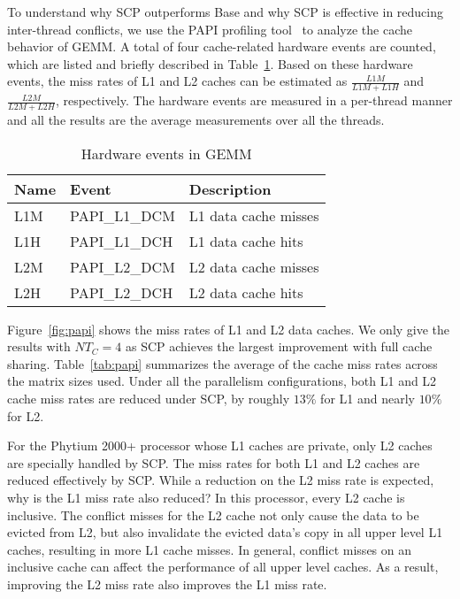 To understand why SCP outperforms Base and
why SCP is effective in reducing
inter-thread conflicts, 
we use the PAPI profiling tool~\cite{papi} to
analyze the cache behavior of GEMM. A total of 
four cache-related hardware events are counted,
which are listed and briefly described in Table~\ref{tab:events}.
Based on these hardware events, the
miss rates of L1 and L2 caches can be estimated  as 
$\frac{L1M}{L1M+L1H}$ and $\frac{L2M}{L2M+L2H}$, respectively.
The hardware events are measured in a per-thread manner
and all the results are the average measurements
over all the threads.

\begin{table}
  \centering
  \caption{Hardware events in GEMM}
  \label{tab:events}
  \begin{tabular}{lll}
    \toprule
    Name & Event & Description \\
    \midrule
    L1M & PAPI\_L1\_DCM & L1 data cache misses \\
    L1H & PAPI\_L1\_DCH & L1 data cache hits \\
    L2M & PAPI\_L2\_DCM & L2 data cache misses \\
    L2H & PAPI\_L2\_DCH & L2 data cache hits \\
    \bottomrule
  \end{tabular}
\end{table}

Figure~\ref{fig:papi} shows the miss rates of L1 and L2 data caches.  We only give the results with $NT_C=4$
as SCP achieves the largest improvement with full cache sharing.
Table~\ref{tab:papi} summarizes the average of the
cache miss rates
across the matrix sizes used.
Under all the parallelism configurations,
both L1 and L2 cache miss rates are reduced under
SCP, 
by roughly $13\%$ for L1 and nearly $10\%$ for L2.

For the Phytium 2000+ processor whose L1 caches are private,
only L2 caches are specially handled by SCP.
The miss rates for both L1 and L2 caches
are reduced effectively by SCP.
While a reduction on the L2 miss rate is expected,
why is the L1 miss rate also reduced? In this processor,
every L2 cache is inclusive.
The conflict misses for the L2 cache not only cause
the data to be evicted from L2,
but also invalidate the evicted data's copy in all upper level L1 caches,
resulting in more L1 cache misses.
In general, conflict misses on an inclusive cache can affect
the performance of all upper level caches. As a 
result, improving the L2 miss rate also improves the
L1 miss rate.

